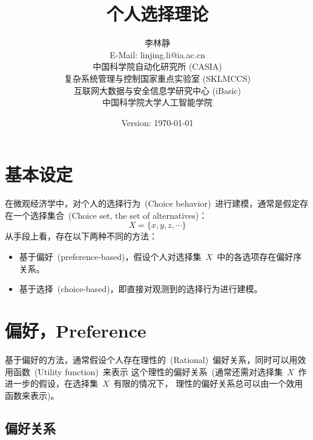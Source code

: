 \documentclass[a4paper,12pt]{article}
\begin{document}
\title{个人选择理论}
\author{李林静 \\ 
   E-Mail: linjing.li@ia.ac.cn  \vspace{1cm} \\
 
 
        中国科学院自动化研究所 (CASIA)\\
        复杂系统管理与控制国家重点实验室 (SKLMCCS)\\
        互联网大数据与安全信息学研究中心 (iBasic)  \vspace{1cm} \\ 
 
 
        中国科学院大学人工智能学院 \vspace{5cm}
}

\date{Version: \today}



\maketitle



\newpage


\section{基本设定}

在微观经济学中，对个人的选择行为~(Choice
behavior)~进行建模，通常是假定存在一个选择集合~(Choice set, the set
of alternatives)：
\begin{equation*}
    X=\{x,y,z,\cdots\}
\end{equation*}
从手段上看，存在以下两种不同的方法：
\begin{itemize}
  \item 基于偏好~(preference-based)，假设个人对选择集~$X$~中的各选项存在偏好序关系。
  \item 基于选择~(choice-based)，即直接对观测到的选择行为进行建模。
\end{itemize}

\section{偏好，Preference}

基于偏好的方法，通常假设个人存在理性的~(Rational)~偏好关系，同时可以用效用函数~(Utility function)~来表示
这个理性的偏好关系~(通常还需对选择集~$X$~作进一步的假设，在选择集~$X$~有限的情况下，
理性的偏好关系总可以由一个效用函数来表示)。

\subsection{偏好关系}
\end{document}
